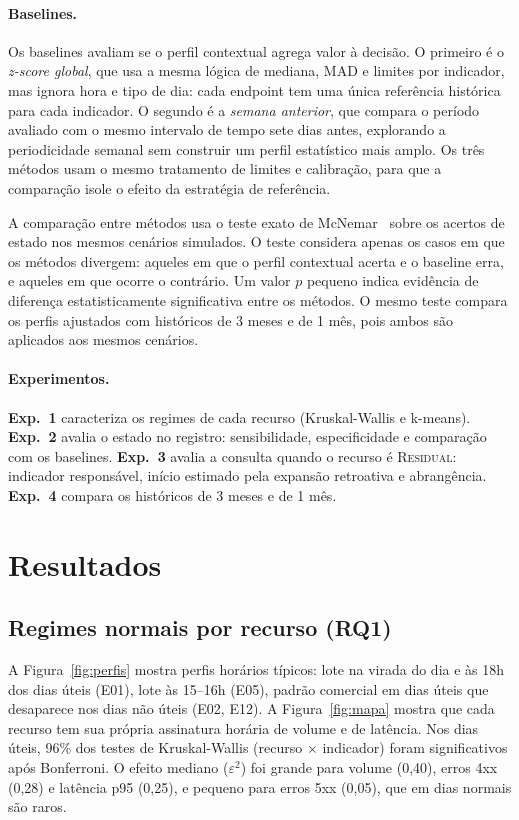 \documentclass[sigconf,nonacm]{acmart}
\newcommand{\Residual}{\textsc{Residual}\xspace}
\begin{document}
\paragraph{Baselines.} Os baselines avaliam se o perfil contextual agrega valor à decisão. O primeiro é o \emph{z-score global}, que usa a mesma lógica de mediana, MAD e limites por indicador, mas ignora hora e tipo de dia: cada endpoint tem uma única referência histórica para cada indicador. O segundo é a \emph{semana anterior}, que compara o período avaliado com o mesmo intervalo de tempo sete dias antes, explorando a periodicidade semanal sem construir um perfil estatístico mais amplo. Os três métodos usam o mesmo tratamento de limites e calibração, para que a comparação isole o efeito da estratégia de referência.

A comparação entre métodos usa o teste exato de McNemar~\citep{mcnemar1947note} sobre os acertos de estado nos mesmos cenários simulados. O teste considera apenas os casos em que os métodos divergem: aqueles em que o perfil contextual acerta e o baseline erra, e aqueles em que ocorre o contrário. Um valor $p$ pequeno indica evidência de diferença estatisticamente significativa entre os métodos. O mesmo teste compara os perfis ajustados com históricos de 3 meses e de 1 mês, pois ambos são aplicados aos mesmos cenários.

\paragraph{Experimentos.} \textbf{Exp.~1} caracteriza os regimes de cada recurso (Kruskal-Wallis e k-means). \textbf{Exp.~2} avalia o estado no registro: sensibilidade, especificidade e comparação com os baselines. \textbf{Exp.~3} avalia a consulta quando o recurso é \Residual: indicador responsável, início estimado pela expansão retroativa e abrangência. \textbf{Exp.~4} compara os históricos de 3 meses e de 1 mês.

\section{Resultados}\label{sec:resultados}

\subsection{Regimes normais por recurso (RQ1)}

A Figura~\ref{fig:perfis} mostra perfis horários típicos: lote na virada do dia e às 18h dos dias úteis (E01), lote às 15--16h (E05), padrão comercial em dias úteis que desaparece nos dias não úteis (E02, E12). A Figura~\ref{fig:mapa} mostra que cada recurso tem sua própria assinatura horária de volume e de latência. Nos dias úteis, 96\% dos testes de Kruskal-Wallis (recurso $\times$ indicador) foram significativos após Bonferroni. O efeito mediano ($\varepsilon^2$) foi grande para volume (0,40), erros 4xx (0,28) e latência p95 (0,25), e pequeno para erros 5xx (0,05), que em dias normais são raros.
\end{document}
